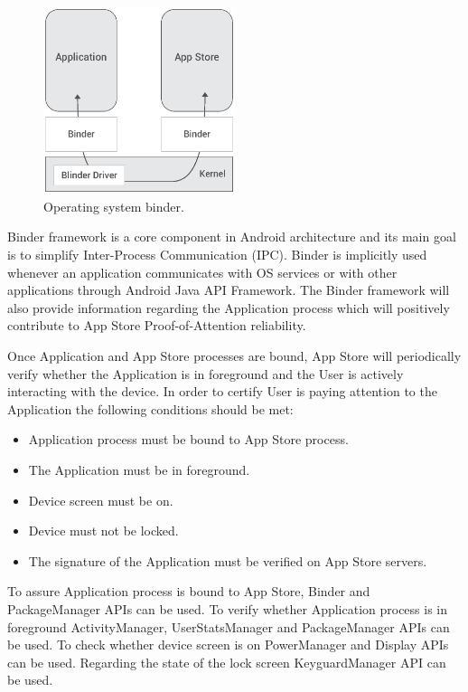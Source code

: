 \begin{figure}[!ht]
\centering
\includegraphics[width=0.5\textwidth]{diagrams/binder_diagram.eps}
\caption{Operating system binder.}
\label{fig:binder}
\end{figure}

Binder framework is a core component in Android architecture and its main goal is to simplify Inter-Process Communication (IPC). Binder is implicitly used whenever an application communicates with OS services or with other applications through Android Java API Framework. The Binder framework will also provide information regarding the Application process which will positively contribute to App Store Proof-of-Attention reliability.

Once Application and App Store processes are bound, App Store will periodically verify whether the Application is in foreground and the User is actively interacting with the device. In order to certify User is paying attention to the Application the following conditions should be met:

\begin{itemize}
\item Application process must be bound to App Store process.
\item The Application must be in foreground.
\item Device screen must be on.
\item Device must not be locked. 
\item The signature of the Application must be verified on App Store servers.
\end{itemize}

To assure Application process is bound to App Store, Binder and PackageManager APIs can be used. To verify whether Application process is in foreground ActivityManager, UserStatsManager and PackageManager APIs can be used. To check whether device screen is on PowerManager and Display APIs can be used. Regarding the state of the lock screen KeyguardManager API can be used. 

